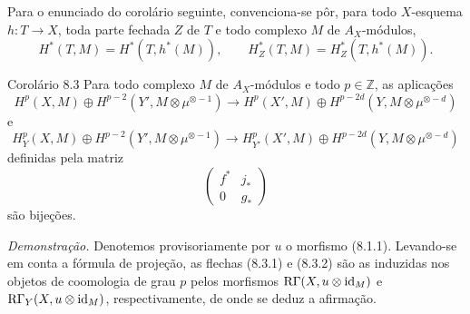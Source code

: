 Para o enunciado do corolário seguinte, convenciona-se pôr, para todo $X$-esquema $h:T\to X$, toda parte fechada $Z$ de $T$ e todo complexo $M$ de $A_X$-módulos,
\[
H^*(T,M)=H^*(T,h^*(M)),\qquad
H^*_Z(T,M)=H^*_Z(T,h^*(M)).
\]

\begin{statement}{Corolário 8.3}
Para todo complexo $M$ de $A_X$-módulos e todo $p\in\mathbb Z$, as aplicações
\[
H^p(X,M)\oplus H^{p-2}(Y',M\otimes\mu^{\otimes -1})
\to
H^p(X',M)\oplus H^{p-2d}(Y,M\otimes\mu^{\otimes -d})
\tag{8.3.1}
\]
e
\[
H_Y^p(X,M)\oplus H^{p-2}(Y',M\otimes\mu^{\otimes -1})
\to
H_{Y'}^p(X',M)\oplus H^{p-2d}(Y,M\otimes\mu^{\otimes -d})
\tag{8.3.2}
\]
definidas pela matriz
\[
\begin{pmatrix}
f^*&j_*\\
0&g_*
\end{pmatrix}
\]
são bijeções.
\end{statement}

\emph{Demonstração.} Denotemos provisoriamente por $u$ o morfismo (8.1.1). Levando-se em conta a fórmula de projeção, as flechas (8.3.1) e (8.3.2) são as induzidas nos objetos de coomologia de grau $p$ pelos morfismos $\mathrm{R}\Gamma(X,u\otimes\operatorname{id}_M)$ e $\mathrm{R}\Gamma_Y(X,u\otimes\operatorname{id}_M)$, respectivamente, de onde se deduz a afirmação.
